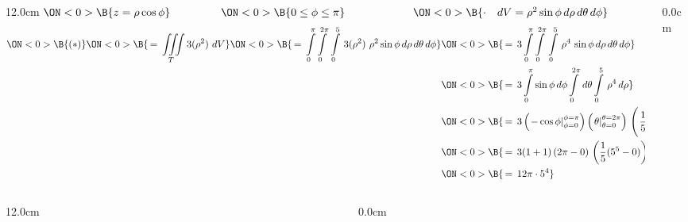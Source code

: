 \begin{frame}
\begin{columns}
\begin{column}{12.0cm}
$\ON<0>{\B{z = \rho \cos \phi}} \hspace{1.6cm} 
\ON<0>{\B{0 \le \phi \le \pi}} \hspace{2.15cm} 
\ON<0>{\B{\cdot \quad dV = \rho^2 \sin \phi \, d\rho \, d\theta \, d\phi}}$ 
\begin{align*}
\ON<0>{\B{(*)}}
\ON<0>{\B{\, = \,\iiint \limits_{T} 3(\rho^2) \,\, dV}}
\ON<0>{\B{\, = \,\int \limits_{0}^{\pi} \int \limits_{0}^{2\pi} \, \int \limits_{0}^{5} \, 3(\rho^2) \,\, \rho^2 \sin \phi \, d\rho \, d\theta \, d\phi}}
&\ON<0>{\B{\, = \,3\int \limits_{0}^{\pi} \int \limits_{0}^{2\pi} \, \int \limits_{0}^{5} \, \rho^4 \, \sin \phi \, d\rho \, d\theta \, d\phi}} \\
&\ON<0>{\B{\, = \,3\int \limits_{0}^{\pi} \sin \phi \, d\phi \int \limits_{0}^{2\pi} \, d\theta \int \limits_{0}^{5} \, \rho^4 \, d\rho}} \\
&\ON<0>{\B{\, = \,3 \left(\left.- \cos \phi \right|_{\phi = 0}^{\phi = \pi}\right) \left(\left. \theta \right|_{\theta = 0}^{\theta = 2\pi}\right) \, \left(\left.\frac{1}{5}\rho^5 \right|_{\rho = 0}^{\rho = 5} \right)}} \\
&\ON<0>{\B{\, = \,3 (1 + 1) \left( 2\pi -0\right) \, \left(\frac{1}{5}(5^5-0) \right)}} \\
&\ON<0>{\B{\, = \,12\pi \cdot 5^4}} \\
\end{align*}

\end{column}\begin{column}{0.0cm}\end{column}\end{columns}
\end{frame}

\begin{frame}
\begin{columns}\begin{column}{12.0cm}
\scriptsize
	
\end{column}\begin{column}{0.0cm}\end{column}\end{columns}
\end{frame}

